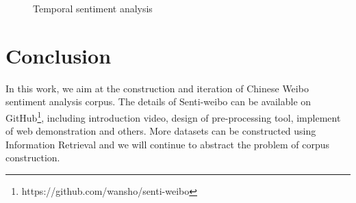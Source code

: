 \documentclass[runningheads]{llncs}
\begin{document}
\begin{figure}[ht]
\vspace{-0.5cm}  %
\centering  %
\caption{Temporal sentiment analysis}
\label{fig:sentiment-trend}
\end{figure}

\section{Conclusion}
 In this work, we aim at the construction and iteration of Chinese Weibo sentiment analysis corpus. The details of Senti-weibo can be available on GitHub\footnote{https://github.com/wansho/senti-weibo}, including introduction video, design of pre-processing tool, implement of web demonstration and others. More datasets can be constructed using Information Retrieval and we will continue to abstract the problem of corpus construction.
 


\end{document}

